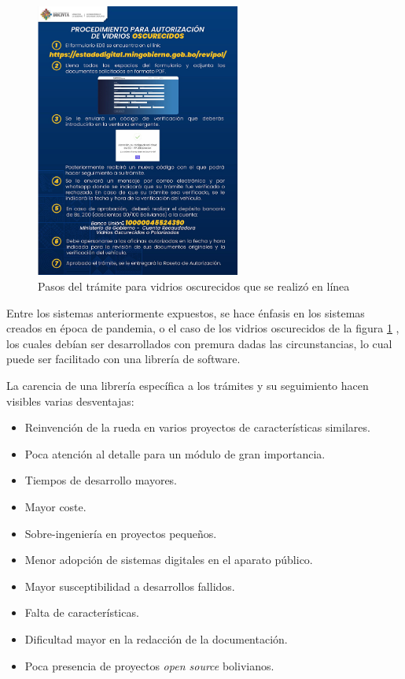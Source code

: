 \begin{figure}[!htpb]
    \centering
    \includegraphics[width=0.6\textwidth]{assets/tramiteoscurecidos.jpg}
    \caption{Pasos del trámite para vidrios oscurecidos que se realizó en línea}
    \label{fig:polarized_procedure_steps}
\end{figure}

Entre los sistemas anteriormente expuestos, se hace énfasis en los sistemas
creados en época de pandemia, o el caso de los vidrios oscurecidos de la figura
\ref{fig:polarized_procedure_steps} , los cuales debían ser desarrollados con
premura dadas las circunstancias, lo cual puede ser facilitado con una librería
de software.

La carencia de una librería específica a los trámites y su seguimiento hacen
visibles varias desventajas:

\begin{itemize}
    \item Reinvención de la rueda en varios proyectos de características
          similares.

    \item Poca atención al detalle para un módulo de gran importancia.

    \item Tiempos de desarrollo mayores.

    \item Mayor coste.

    \item Sobre-ingeniería en proyectos pequeños.

    \item Menor adopción de sistemas digitales en el aparato público.

    \item Mayor susceptibilidad a desarrollos fallidos.

    \item Falta de características.

    \item Dificultad mayor en la redacción de la documentación.

    \item Poca presencia de proyectos \textit{open source} bolivianos.
\end{itemize}

